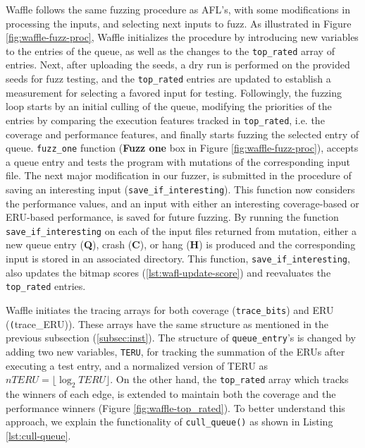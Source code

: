 Waffle follows the same fuzzing procedure as AFL's, with some modifications in processing the inputs, and selecting next inputs to fuzz. As illustrated in Figure \ref{fig:waffle-fuzz-proc}, Waffle initializes the procedure by introducing new variables to the entries of the queue, as well as the changes to the \texttt{top\_rated} array of entries. Next, after uploading the seeds, a dry run is performed on the provided seeds for fuzz testing, and the \texttt{top\_rated} entries are updated to establish a measurement for selecting a favored input for testing. Followingly, the fuzzing loop starts by an initial culling of the queue, modifying the priorities of the entries by comparing the execution features tracked in \texttt{top\_rated}, i.e. the coverage and performance features, and finally starts fuzzing the selected entry of queue. \texttt{fuzz\_one} function (\textbf{Fuzz one} box in Figure \ref{fig:waffle-fuzz-proc}), accepts a queue entry and tests the program with mutations of the corresponding input file. The next major modification in our fuzzer, is submitted in the procedure of saving an interesting input (\texttt{save\_if\_interesting}). This function now considers the performance values, and an input with either an interesting coverage-based or ERU-based performance, is saved for future fuzzing. By running the function \texttt{save\_if\_interesting} on each of the input files returned from mutation, either a new queue entry (\textbf{Q}), crash (\textbf{C}), or hang (\textbf{H}) is produced and the corresponding input is stored in an associated directory. This function, \texttt{save\_if\_interesting}, also updates the bitmap scores (\ref{lst:wafl-update-score}) and reevaluates the \texttt{top\_rated} entries.




Waffle initiates the tracing arrays for both coverage (\texttt{trace\_bits}) and ERU (\texttt(trace\_ERU)). These arrays have the same structure as mentioned in the previous subsection (\ref{subsec:inst}). The structure of \texttt{queue\_entry}'s is changed by adding two new variables, \texttt{TERU}, for tracking the summation of the ERUs after executing a test entry, and a normalized version of TERU as $nTERU= \lfloor \log_{2} {TERU}\rfloor$. On the other hand, the \texttt{top\_rated} array which tracks the winners of each edge, is extended to maintain both the coverage and the performance winners (Figure \ref{fig:waffle-top_rated}). To better understand this approach, we explain the functionality of \texttt{cull\_queue()} as shown in Listing \ref{lst:cull-queue}.

